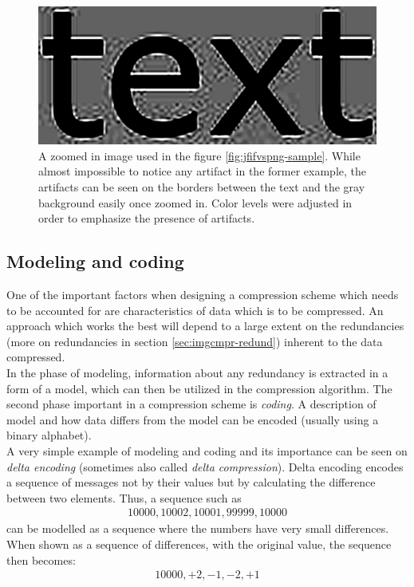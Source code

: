 \documentclass[thesis=M,english]{FITthesis}[2012/10/20]
\begin{document}
\begin{figure}[h]
  \centering
  \includegraphics[scale=0.3]{imgs/text-artifacts}
  \caption{A zoomed in image used in the figure \ref{fig:jfifvspng-sample}. While
           almost impossible to notice any artifact in the former example,
           the artifacts can be seen on the borders between the text and the
           gray background easily once zoomed in. Color levels were adjusted
           in order to emphasize the presence of artifacts.}
  \label{fig:jfifartifact}
\end{figure}


\subsection{Modeling and coding}
One of the important factors when designing a compression scheme which needs to
be accounted for are characteristics of data which is to be compressed. An approach
which works the best will depend to a large extent on the redundancies (more on
redundancies in section \ref{sec:imgcmpr-redund}) inherent to the data compressed.
\\

In the phase of modeling, information about any redundancy is extracted in a form
of a model, which can then be utilized in the compression algorithm. The second phase
important in a compression scheme is \emph{coding}. A description of model and how
data differs from the model can be encoded (usually using a binary alphabet).\cite{datacompression}
\\

A very simple example of modeling and coding and its importance can be seen on \emph{delta
encoding} (sometimes also called \emph{delta compression}). Delta encoding encodes
a sequence of messages not by their values but by calculating the difference
between two elements.\cite{signalprocessing} Thus, a sequence such as
\begin{align*}
  10000, 10002, 10001, 99999, 10000
\end{align*}
can be modelled as a sequence where the numbers have very small differences.
When shown as a sequence of differences, with the original value, the sequence
then becomes:
\begin{align*}
  10000, +2, -1, -2, +1
\end{align*}
\\
\end{document}
